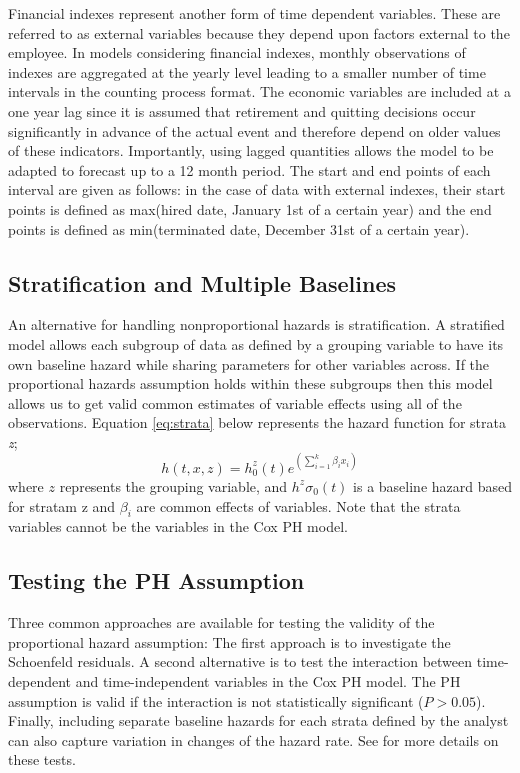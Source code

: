 Financial indexes represent another form of time dependent variables. These are referred to as external variables because they depend upon factors external to the employee. In models considering financial indexes, monthly observations of indexes are aggregated at the yearly level leading to a smaller number of time intervals in the counting process format.  The economic variables are included at a one year lag since it is assumed that retirement and quitting decisions occur significantly in advance of the actual event and therefore depend on older values of these indicators. Importantly, using lagged quantities allows the model to be adapted to forecast up to a 12 month period. 
The start and end points of each interval are given as follows: in the case of data with external indexes, their start points is defined as max(hired date, January 1st of a certain year) and the end points is defined as min(terminated date, December 31st of a certain year).
\subsection{Stratification and Multiple Baselines}
An alternative for handling nonproportional hazards is stratification.  A stratified model allows each subgroup of data as defined by a grouping variable to have its own baseline hazard while sharing parameters for other variables across. If the proportional hazards assumption holds within these subgroups then this model allows us to get valid common estimates of variable effects using all of the observations. Equation \ref{eq:strata} below represents the hazard function for strata {\it z};
\begin{equation}
\label{eq:strata}
h(t,x,z)=h^z_0(t)e^{(\sum_{i=1}^{k}\beta_ix_i)}
\end{equation}
where $z$ represents the grouping variable, and $h^z\sigma_0(t)$ is a baseline hazard based for stratam z and $\beta_i$ are common effects of variables. Note that the strata variables cannot be the variables in the Cox PH model.
\subsection{Testing the PH Assumption}
Three common approaches are available for testing the validity of the proportional hazard assumption: The first approach is to investigate the Schoenfeld residuals. A second alternative is to test the interaction between time-dependent and time-independent variables in the Cox PH model. The PH assumption is valid if the interaction is not statistically significant ($P>0.05$). Finally, including separate baseline hazards for each strata defined by the analyst can also capture variation in changes of the hazard rate. See \citet{allison2010,collett2015} for more details on these tests.

